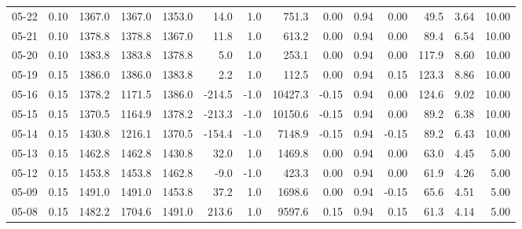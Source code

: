 \begin{threeparttable}
{\begin{tabular}{lrrrrrrrrrrrrr}
  05-22 &     0.10 & 1367.0 & 1367.0 & 1353.0 &       14.0 &                      1.0 &               751.3 &       0.00 &      0.94 &           0.00 &             49.5 &            3.64 &                  10.00 \\
  05-21 &     0.10 & 1378.8 & 1378.8 & 1367.0 &       11.8 &                      1.0 &               613.2 &       0.00 &      0.94 &           0.00 &             89.4 &            6.54 &                  10.00 \\
  05-20 &     0.10 & 1383.8 & 1383.8 & 1378.8 &        5.0 &                      1.0 &               253.1 &       0.00 &      0.94 &           0.00 &            117.9 &            8.60 &                  10.00 \\
  05-19 &     0.15 & 1386.0 & 1386.0 & 1383.8 &        2.2 &                      1.0 &               112.5 &       0.00 &      0.94 &           0.15 &            123.3 &            8.86 &                  10.00 \\
  05-16 &     0.15 & 1378.2 & 1171.5 & 1386.0 &     -214.5 &                     -1.0 &             10427.3 &      -0.15 &      0.94 &           0.00 &            124.6 &            9.02 &                  10.00 \\
  05-15 &     0.15 & 1370.5 & 1164.9 & 1378.2 &     -213.3 &                     -1.0 &             10150.6 &      -0.15 &      0.94 &           0.00 &             89.2 &            6.38 &                  10.00 \\
  05-14 &     0.15 & 1430.8 & 1216.1 & 1370.5 &     -154.4 &                     -1.0 &              7148.9 &      -0.15 &      0.94 &          -0.15 &             89.2 &            6.43 &                  10.00 \\
  05-13 &     0.15 & 1462.8 & 1462.8 & 1430.8 &       32.0 &                      1.0 &              1469.8 &       0.00 &      0.94 &           0.00 &             63.0 &            4.45 &                   5.00 \\
  05-12 &     0.15 & 1453.8 & 1453.8 & 1462.8 &       -9.0 &                     -1.0 &               423.3 &       0.00 &      0.94 &           0.00 &             61.9 &            4.26 &                   5.00 \\
  05-09 &     0.15 & 1491.0 & 1491.0 & 1453.8 &       37.2 &                      1.0 &              1698.6 &       0.00 &      0.94 &          -0.15 &             65.6 &            4.51 &                   5.00 \\
  05-08 &     0.15 & 1482.2 & 1704.6 & 1491.0 &      213.6 &                      1.0 &              9597.6 &       0.15 &      0.94 &           0.15 &             61.3 &            4.14 &                   5.00 \\

\end{tabular}}
\end{threeparttable}

